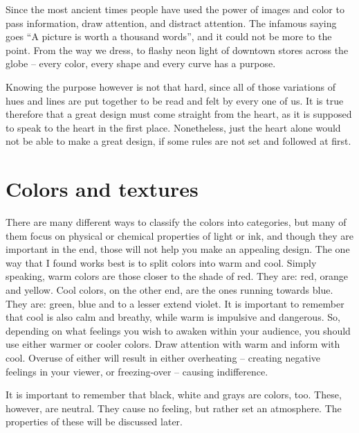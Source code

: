 

\noindent{}Since the most ancient times people have used the power of images and color to
pass information, draw attention, and distract attention. The infamous
saying goes ``A picture is worth a thousand words'', and it could not be more to
the point. From the way we dress, to flashy neon light of downtown stores across
the globe -- every color, every shape and every curve has a purpose.

Knowing the purpose however is not that hard, since all of those variations of
hues and lines are put together to be read and felt by every one of us. It is
true therefore that a great design must come straight from the heart, as it is
supposed to speak to the heart in the first place. Nonetheless, just the heart
alone would not be able to make a great design, if some rules are not set and
followed at first.

\section*{Colors and textures}

There are many different ways to classify the colors into categories, but many of
them focus on physical or chemical properties of light or ink, and though they are
important in the end, those will not help you make an appealing design. The one way
that I found works best is to split colors into warm and cool. Simply speaking,
warm colors are those closer to the shade of red. They are: red, orange and
yellow. Cool colors, on the other end, are the ones running towards blue. They are: green,
blue and to a lesser extend violet. It is important to remember that cool is
also calm and breathy, while warm is impulsive and dangerous. So, depending on
what feelings you wish to awaken within your audience, you should use either
warmer or cooler colors. Draw attention with warm and inform with cool.
Overuse of either will result in either overheating -- creating negative feelings
in your viewer, or freezing-over -- causing indifference.

It is important to remember that black, white and grays are colors, too. These,
however, are neutral. They cause no feeling, but rather set an atmosphere. The
properties of these will be discussed later.

